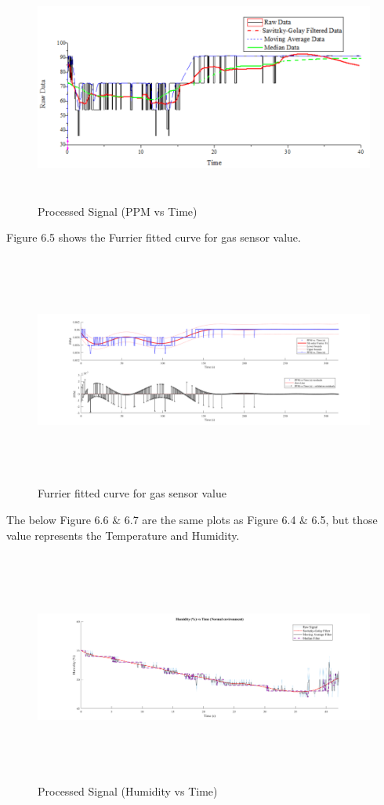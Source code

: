 \begin{figure}[H]
	\begin{Center}
		\includegraphics[width=6.5in,height=3in]{18}
		\caption{Processed Signal (PPM vs Time)}
		\label{fig:_4_Processed_Signal_PPM_vs_Time}
	\end{Center}
\end{figure}
Figure 6.5 shows the Furrier fitted curve for gas sensor value.
\begin{figure}[H]
  \centering
  \includegraphics[width=6.5in,height=3in]{19}
  \caption{Furrier fitted curve for gas sensor value}\label{fig19}
\end{figure}
The below Figure 6.6 $\&$  6.7 are the same plots as Figure 6.4 $\&$  6.5, but those value represents the Temperature and Humidity.
\begin{figure}[H]
	\begin{Center}
		\includegraphics[width=6.5in,height=3in]{20}
		\caption{Processed Signal (Humidity vs Time)}
		\label{fig:_6_Processed_Signal_Humidity_vs_Time}
	\end{Center}
\end{figure}
